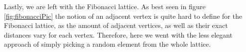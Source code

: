 Lastly, we are left with the Fibonacci lattice. As best seen in figure \ref{fig:fibonacciPic} the notion of an adjacent vertex is quite hard to define for the Fibonacci lattice, as the amount of adjacent vertices, as well as their exact distances vary for each vertex. Therefore, here we went with the less elegant approach of simply picking a random element from the whole lattice.

